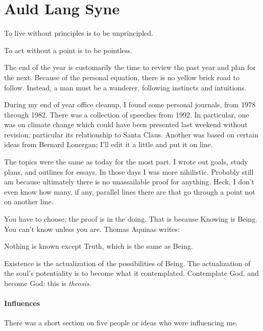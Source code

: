 \section{Auld Lang Syne}

\begin{quotex}
To live without principles is to be unprincipled.

To act without a point is to be pointless.
\end{quotex}


The end of the year is customarily the time to review the past year and plan for the next. Because of the personal equation, there is no yellow brick road to follow. Instead, a man must be a wanderer, following instincts and intuitions.

During my end of year office cleanup, I found some personal journals, from 1978 through 1982. There was a collection of speeches from 1992. In particular, one was on climate change which could have been presented last weekend without revision; particular its relationship to Santa Claus. Another was based on certain ideas from Bernard Lonergan; I'll edit it a little and put it on line.

The topics were the same as today for the most part. I wrote out goals, study plans, and outlines for essays. In those days I was more nihilistic. Probably still am because ultimately there is no unassailable proof for anything. Heck, I don't even know how many, if any, parallel lines there are that go through a point not on another line.

You have to choose; the proof is in the doing. That is because Knowing is Being. You can't know unless you are. Thomas Aquinas writes:

\begin{quotex}
Nothing is known except Truth, which is the same as Being.
\end{quotex}


Existence is the actualization of the possibilities of Being. The actualization of the soul's potentiality is to become what it contemplated. Contemplate God, and become God: this is \emph{theosis}.

\paragraph{Influences}


There was a short section on five people or ideas who were influencing me.

